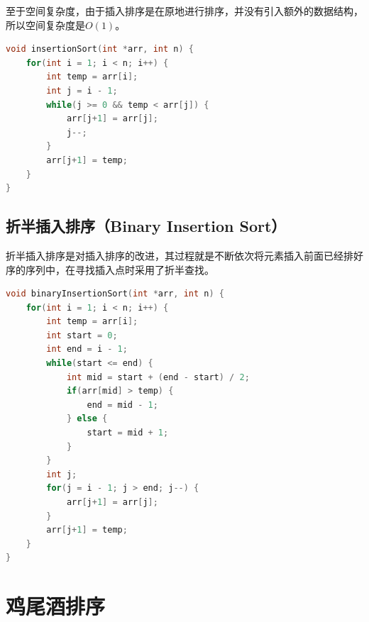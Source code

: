 至于空间复杂度，由于插入排序是在原地进行排序，并没有引入额外的数据结构，所以空间复杂度是$ O(1) $。

\begin{table}[H]
    \centering
    \caption{插入排序算法分析}
\end{table}


\begin{lstlisting}[language=C]
void insertionSort(int *arr, int n) {
    for(int i = 1; i < n; i++) {
        int temp = arr[i];
        int j = i - 1;
        while(j >= 0 && temp < arr[j]) {
            arr[j+1] = arr[j];
            j--;
        }
        arr[j+1] = temp;
    }
}
\end{lstlisting}

\subsection{折半插入排序（Binary Insertion Sort）}

折半插入排序是对插入排序的改进，其过程就是不断依次将元素插入前面已经排好序的序列中，在寻找插入点时采用了折半查找。 \\


\begin{lstlisting}[language=C]
void binaryInsertionSort(int *arr, int n) {
    for(int i = 1; i < n; i++) {
        int temp = arr[i];
        int start = 0;
        int end = i - 1;
        while(start <= end) {
            int mid = start + (end - start) / 2;
            if(arr[mid] > temp) {
                end = mid - 1;
            } else {
                start = mid + 1;
            }
        }
        int j;
        for(j = i - 1; j > end; j--) {
            arr[j+1] = arr[j];
        }
        arr[j+1] = temp;
    }
}
\end{lstlisting}

\newpage

\section{鸡尾酒排序}

